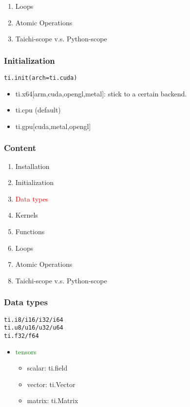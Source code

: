 \documentclass[serif,mathserif]{beamer}
\begin{document}
\begin{CJK}{UTF8}{gbsn}
\begin{frame}
\begin{enumerate}
  \item Loops
  \item Atomic Operations
  \item Taichi-scope v.s. Python-scope
  \end{enumerate}
\end{frame}

\begin{frame}[fragile]
  \frametitle{Initialization}

  \begin{tcolorbox}
\begin{verbatim}
ti.init(arch=ti.cuda)
\end{verbatim}
  \end{tcolorbox}

  \begin{itemize}
  \item ti.x64[arm,cuda,opengl,metal]: stick to a certain backend.
  \item ti.cpu (default)
  \item ti.gpu[cuda,metal,opengl]
  \end{itemize}

\end{frame}

\begin{frame}
  \frametitle{Content}
  \begin{enumerate}
  \item Installation
  \item Initialization
  \item \textcolor{red}{Data types}
  \item Kernels
  \item Functions
  \item Loops
  \item Atomic Operations
  \item Taichi-scope v.s. Python-scope
  \end{enumerate}
\end{frame}


\begin{frame}[fragile]
  \frametitle{Data types}
  \begin{tcolorbox}
\begin{verbatim}
ti.i8/i16/i32/i64
ti.u8/u16/u32/u64
ti.f32/f64
\end{verbatim}
  \end{tcolorbox}
  \begin{itemize}
  \item \textcolor{green}{tensors}
    \begin{itemize}
    \item scalar: ti.field
    \item vector: ti.Vector
    \item matrix: ti.Matrix
    \end{itemize}
  \end{itemize}
\end{frame}


\end{CJK}
\end{document}
